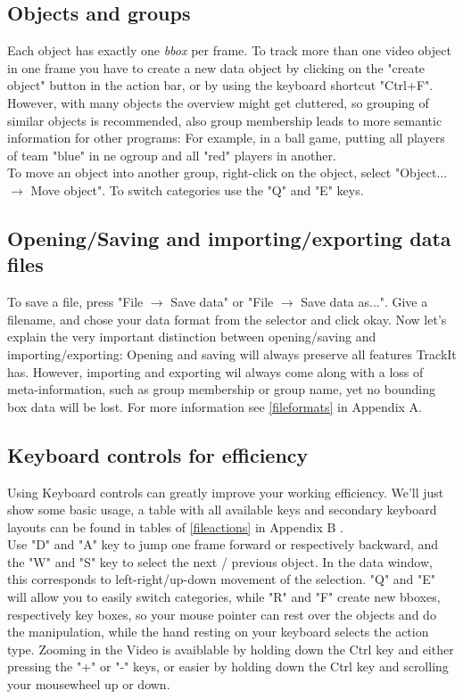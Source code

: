 \subsection{Objects and groups}
\label{sec:groupsandobjects}
  Each object has exactly one \emph{bbox} per frame. To track more than one video object in one frame you have to create a new data object by clicking on the "create object" button in the action bar, or by using the keyboard shortcut "Ctrl+F".\\
However, with many objects the overview might get cluttered, so grouping of similar objects is recommended, also group membership leads to more semantic information for other programs:
For example, in a ball game, putting all players of team "blue" in ne ogroup and all "red" players in another. \\ To move an object into another group, right-click on the object, select "Object... $\rightarrow$ Move object". To switch categories use the "Q" and "E" keys.

\subsection{Opening/Saving and importing/exporting data files}
To save a file, press "File $\rightarrow$ Save data" or "File $\rightarrow$ Save data as...". Give a filename, and chose your data format from the selector and click okay.
Now let's explain the very important distinction between opening/saving and importing/exporting: Opening and saving will always preserve all features TrackIt has. However, importing and exporting wil always come along with a loss of meta-information, such as group membership or group name, yet no bounding box data will be lost. For more information see \ref{fileformats} in Appendix A.

\subsection{Keyboard controls for efficiency}
Using Keyboard controls can greatly improve your working efficiency.  We'll just show some basic usage, a table with all available keys and secondary keyboard layouts can be found in tables of \ref{fileactions} in Appendix B .\\
Use "D" and "A" key to jump one frame forward or respectively backward, and the "W" and "S" key to select the next / previous object. In the data window, this corresponds to left-right/up-down movement of the selection. "Q" and "E" will allow you to easily switch categories, while "R" and "F" create new bboxes, respectively key boxes, so your mouse pointer can rest over the objects and do the manipulation, while the hand resting on your keyboard selects the action type.
Zooming in the Video is avaiblable by holding down the Ctrl key and either pressing the "+" or "-" keys, or easier by holding down the Ctrl key and scrolling your mousewheel up or down.



